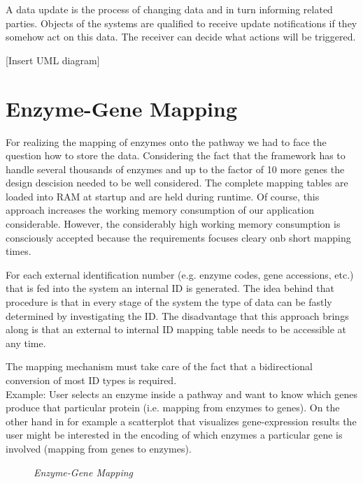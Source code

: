 A data update is the process of changing data and in turn informing related parties. Objects of the systems are qualified to receive update notifications if they somehow act on this data. The receiver can decide what actions will be triggered.
 
[Insert UML diagram]


\section{Enzyme-Gene Mapping}

For realizing the mapping of enzymes onto the pathway we had to face the question how to store the data. Considering the fact that the framework has to handle several thousands of enzymes and up to the factor of 10 more genes the design descision needed to be well considered. The complete mapping tables are loaded into RAM at startup and are held during runtime. Of course, this approach increases the working memory consumption of our application considerable. However, the considerably high working memory consumption is consciously accepted because the requirements focuses cleary onb short mapping times.

For each external identification number (e.g. enzyme codes, gene accessions, etc.) that is fed into the system an internal ID is generated. The idea behind that procedure is that in every stage of the system the type of data can be fastly determined by investigating the ID. The disadvantage that this approach brings along is that an external to internal ID mapping table needs to be accessible at any time. 

The mapping mechanism must take care of the fact that a bidirectional conversion of most ID types is required.\\
Example: User selects an enzyme inside a pathway and want to know which genes produce that particular protein (i.e. mapping from enzymes to genes). On the other hand in for example a scatterplot that visualizes gene-expression results the user might be interested in the encoding of which enzymes a particular gene is involved (mapping from genes to enzymes).

\begin{figure}[ht]
\centering
{} 
\caption[Enzyme-Gene Mapping]{\textit{Enzyme-Gene Mapping}} 
\label{gfx:enzyme_gene_mapping}
\end{figure}

